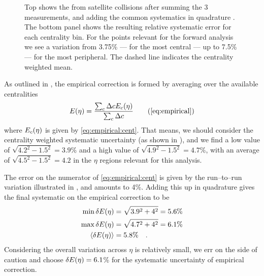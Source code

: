\begin{figure}[h!tbp]
  \centering
  \caption{Top shows the \ndndeta{} from satellite collisions after
    summing the 3 measurements, and adding the common systematics in
    quadrature \cite{Abbas:2013bpa}.  The bottom panel shows the
    resulting relative systematic error for each centrality bin. For
    the points relevant for the forward analysis we see a variation
    from 3.75\% --- for the most central --- up to 7.5\% --- for the
    most peripheral.  The dashed line indicates the centrality
    weighted mean. }
  \label{fig:dndeta:sat:results}
\end{figure}

As outlined in , the empirical correction is
formed by averaging over the available centralities 
\begin{equation}
  \EmpCor{} = \frac{\sum_c \Delta c\EmpCor[c]{}}{\sum_c \Delta c}
  \tag{\ref{eq:empirical}}
\end{equation}
where $\EmpCor[c]{}$ is given by \eqref{eq:empirical:cent}.  That
means, we should consider the centrality weighted systematic
uncertainty (as shown in ), and we find
a low value of $\sqrt{4.2^2-1.5^2}=3.9$\% and a high value of
$\sqrt{4.9^2-1.5^2}=4.7$\%, with an average of
$\sqrt{4.5^2-1.5^2}=4.2$ in the $\eta$ regions relevant for this
analysis.

The error on the numerator of \eqref{eq:empirical:cent} is given by
the run--to--run variation illustrated in
, and amounts to 4\%.  Adding this
up in quadrature gives the final systematic on the empirical
correction to be 
\begin{align}
  \label{eq:empcorr:syserr}
  \min{\delta\EmpCor{}} &= \sqrt{3.9^2+4^2} = 5.6\%\nonumber\\
  \max{\delta\EmpCor{}} &= \sqrt{4.7^2+4^2} = 6.1\%\nonumber\\
  \langle\delta\EmpCor{}\rangle &= 5.8\%\quad.\\
\end{align}
Considering the overall variation across $\eta$ is relatively small,
we err on the side of caution and choose $\delta\EmpCor{}=6.1$\% for
the systematic uncertainty of empirical correction.
